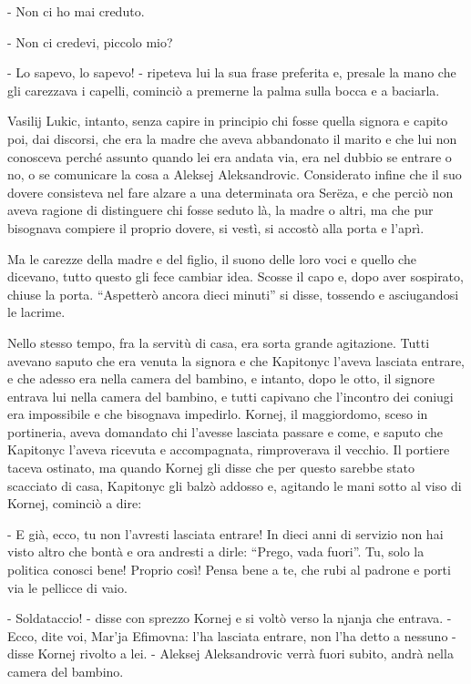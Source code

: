 - Non ci ho mai creduto. 

- Non ci credevi, piccolo mio? 

- Lo sapevo, lo sapevo! - ripeteva lui la sua frase preferita e, presale la mano che gli carezzava i capelli, cominciò a premerne la palma sulla bocca e a baciarla. 

\label{xxx-3} 

Vasilij Lukic, intanto, senza capire in principio chi fosse quella signora e capito poi, dai discorsi, che era la madre che aveva abbandonato il marito e che lui non conosceva perché assunto quando lei era andata via, era nel dubbio se entrare o no, o se comunicare la cosa a Aleksej Aleksandrovic. Considerato infine che il suo dovere consisteva nel fare alzare a una determinata ora Serëza, e che perciò non aveva ragione di distinguere chi fosse seduto là, la madre o altri, ma che pur bisognava compiere il proprio dovere, si vestì, si accostò alla porta e l'aprì. 

Ma le carezze della madre e del figlio, il suono delle loro voci e quello che dicevano, tutto questo gli fece cambiar idea. Scosse il capo e, dopo aver sospirato, chiuse la porta. ``Aspetterò ancora dieci minuti'' si disse, tossendo e asciugandosi le lacrime. 

Nello stesso tempo, fra la servitù di casa, era sorta grande agitazione. Tutti avevano saputo che era venuta la signora e che Kapitonyc l'aveva lasciata entrare, e che adesso era nella camera del bambino, e intanto, dopo le otto, il signore entrava lui nella camera del bambino, e tutti capivano che l'incontro dei coniugi era impossibile e che bisognava impedirlo. Kornej, il maggiordomo, sceso in portineria, aveva domandato chi l'avesse lasciata passare e come, e saputo che Kapitonyc l'aveva ricevuta e accompagnata, rimproverava il vecchio. Il portiere taceva ostinato, ma quando Kornej gli disse che per questo sarebbe stato scacciato di casa, Kapitonyc gli balzò addosso e, agitando le mani sotto al viso di Kornej, cominciò a dire: 

- E già, ecco, tu non l'avresti lasciata entrare! In dieci anni di servizio non hai visto altro che bontà e ora andresti a dirle: ``Prego, vada fuori''. Tu, solo la politica conosci bene! Proprio così! Pensa bene a te, che rubi al padrone e porti via le pellicce di vaio. 

- Soldataccio! - disse con sprezzo Kornej e si voltò verso la njanja che entrava. - Ecco, dite voi, Mar'ja Efimovna: l'ha lasciata entrare, non l'ha detto a nessuno - disse Kornej rivolto a lei. - Aleksej Aleksandrovic verrà fuori subito, andrà nella camera del bambino. 

